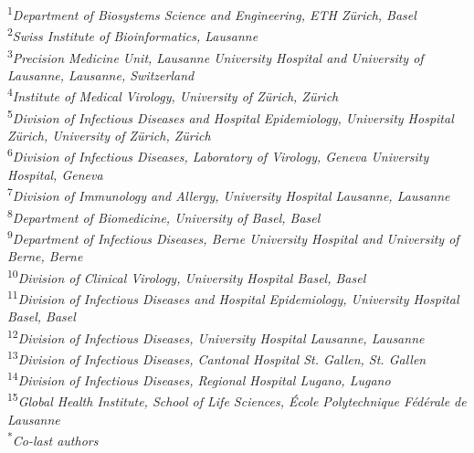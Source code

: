\documentclass[]{article}
\begin{document}
\noindent
\textsuperscript{1}\emph{Department of Biosystems Science and Engineering, ETH Zürich, Basel} \\
\textsuperscript{2}\emph{Swiss Institute of Bioinformatics, Lausanne} \\
\textsuperscript{3}\emph{Precision Medicine Unit, Lausanne University Hospital and University of Lausanne, Lausanne, Switzerland} \\
\textsuperscript{4}\emph{Institute of Medical Virology, University of Zürich, Zürich} \\
\textsuperscript{5}\emph{Division of Infectious Diseases and Hospital Epidemiology, University Hospital Zürich, University of Zürich, Zürich} \\
\textsuperscript{6}\emph{Division of Infectious Diseases, Laboratory of Virology, Geneva University Hospital, Geneva} \\
\textsuperscript{7}\emph{Division of Immunology and Allergy, University Hospital Lausanne, Lausanne} \\
\textsuperscript{8}\emph{Department of Biomedicine, University of Basel, Basel} \\
\textsuperscript{9}\emph{Department of Infectious Diseases, Berne University Hospital and University of Berne, Berne} \\
\textsuperscript{10}\emph{Division of Clinical Virology, University Hospital Basel, Basel} \\
\textsuperscript{11}\emph{Division of Infectious Diseases and Hospital Epidemiology, University Hospital Basel, Basel} \\
\textsuperscript{12}\emph{Division of Infectious Diseases, University Hospital Lausanne, Lausanne} \\
\textsuperscript{13}\emph{Division of Infectious Diseases, Cantonal Hospital St. Gallen, St. Gallen} \\
\textsuperscript{14}\emph{Division of Infectious Diseases, Regional Hospital Lugano, Lugano} \\
\textsuperscript{15}\emph{Global Health Institute, School of Life Sciences, École Polytechnique Fédérale de Lausanne} \\
\textsuperscript{*}\emph{Co-last authors}
\end{document}
